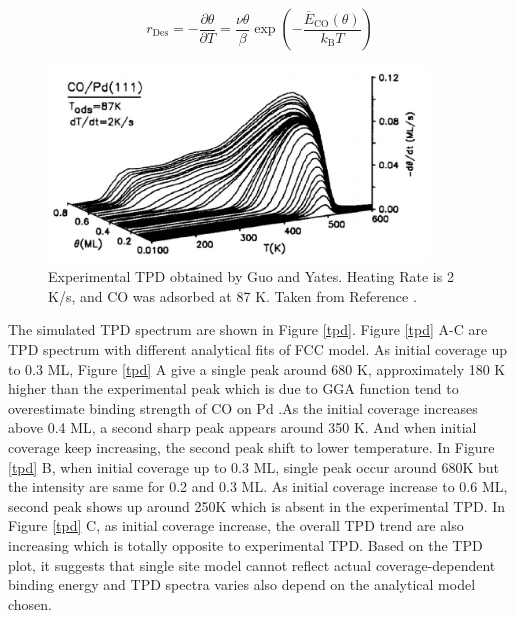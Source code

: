 \documentclass[11pt]{article}
\begin{document}
\begin{equation} \label{redhead}
	r_\mathrm{Des}=-\frac{\partial \theta}{\partial T}=\frac{\nu \theta}{\beta} \exp \left( - \frac{\overline{E}_\mathrm{CO}(\theta)}{k_\mathrm{B} T} \right)
\end{equation}

\begin{figure} [ht]
	\centering
	\includegraphics[width=0.9\textwidth]{Figure/Ex_TPD.pdf}
	\caption{Experimental TPD obtained by Guo and Yates. Heating Rate is 2 K/s, and CO was adsorbed at 87 K. Taken from Reference \cite{Guo1989}.}
	\label{Exp_TPD}
\end{figure}

The simulated TPD spectrum are shown in Figure \ref{tpd}.  Figure \ref{tpd} A-C are TPD spectrum with different analytical fits of FCC model. As initial coverage up to 0.3 ML, Figure \ref{tpd} A give a single peak around 680 K, approximately 180 K higher than the experimental peak which is due to GGA function tend to overestimate binding strength of CO on Pd \cite{Perdew1996, Herron2012,wellendorff2015}.As the initial coverage increases above 0.4 ML, a second sharp peak appears around 350 K. And when initial coverage keep increasing, the second peak shift to lower temperature. In Figure \ref{tpd} B, when initial coverage up to 0.3 ML, single peak occur around 680K but the intensity are same for 0.2 and 0.3 ML. As initial coverage increase to 0.6 ML, second peak shows up around 250K which is absent in the experimental TPD. In Figure \ref{tpd} C, as initial coverage increase, the overall TPD trend are also increasing which is totally opposite to experimental TPD. Based on the TPD plot, it suggests that single site model cannot reflect actual coverage-dependent binding energy and TPD spectra varies also depend on the analytical model chosen.
\end{document}
